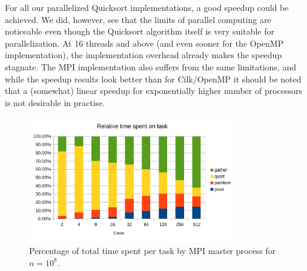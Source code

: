 \documentclass[12pt,a4paper]{article}
\begin{document}
For all our parallelized Quicksort implementations, a good speedup could be achieved. We did, however, see that the limits of parallel computing are noticeable even though the Quicksort algorithm itself is very suitable for parallelization. At 16 threads and above (and even sooner for the OpenMP implementation), the implementation overhead already makes the speedup stagnate. The MPI implementation also suffers from the same limitations, and while the speedup results look better than for Cilk/OpenMP it should be noted that a (somewhat) linear speedup for exponentially higher number of processors is not desirable in practise.

\begin{figure}[h]
	\includegraphics[width=0.8\textwidth]{img/mpi_rel_time.pdf}
	\caption{Percentage of total time spent per task by MPI master process for $n=10^{8}$.}
\end{figure}
\end{document}
